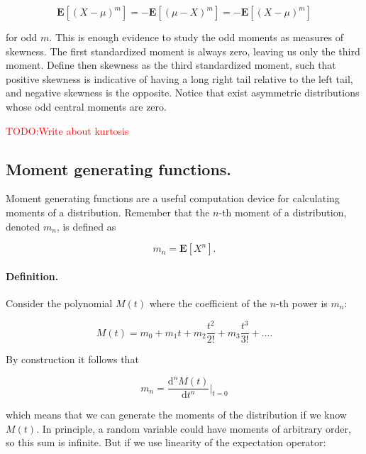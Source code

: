 \documentclass[12pt]{article}
\begin{document}
\begin{equation}
\mathbf{E} [( X - \mu )^{m} ] = - \mathbf{E} [ (\mu - X)^{m} ] = - \mathbf{E} [ (X - \mu)^{m} ]
\end{equation}

\noindent
for odd $m$.
This is enough evidence to study the odd moments as measures of skewness.
The first standardized moment is always zero, leaving us only the third moment.
Define then skewness as the third standardized moment, such that
positive skewness is indicative of having a long right tail relative to the left tail,
and negative skewness is the opposite.
Notice that exist asymmetric distributions whose odd central moments are zero.

\begin{center}
\textcolor{red}{TODO:Write about kurtosis}
\end{center}
\subsection{Moment generating functions.}
Moment generating functions are a useful computation device for 
calculating moments of a distribution.
Remember that the $n$-th moment of a distribution, denoted $m_{n}$, is defined
as

\begin{equation}
m_{n} = \mathbf{E} [ X^{n} ].
\end{equation}

\paragraph{Definition.}
Consider the polynomial $M(t)$ where the coefficient of the $n$-th power is
$m_{n}$:

\begin{equation}
M(t) = m_{0} + m_{1} t + m_{2} \frac{t^{2}}{2!} + m_{3} \frac{t^{3}}{3!} + \ldots. 
\end{equation} 

\noindent
By construction it follows that

\begin{equation}
m_{n} = \frac{\mathrm{d}^{n} M(t) }{\mathrm{d} t^{n} } \bigg\vert_{t = 0}
\end{equation}

\noindent
which means that we can generate the moments of the distribution if we know $M(t)$.
In principle, a random variable could have moments of arbitrary order, so this sum
is infinite. But if we use linearity of the expectation operator:
\end{document}
